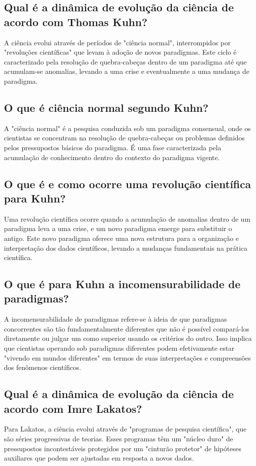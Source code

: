 \documentclass[12pt]{article}
\begin{document}
\subsection{\textbf{Qual é a dinâmica de evolução da ciência de acordo com Thomas Kuhn?}}
A ciência evolui através de períodos de "ciência normal", interrompidos por "revoluções científicas" que levam à adoção de novos paradigmas. Este ciclo é caracterizado pela resolução de quebra-cabeças dentro de um paradigma até que acumulam-se anomalias, levando a uma crise e eventualmente a uma mudança de paradigma.
\subsection{\textbf{O que é ciência normal segundo Kuhn?}}
A "ciência normal" é a pesquisa conduzida sob um paradigma consensual, onde os cientistas se concentram na resolução de quebra-cabeças ou problemas definidos pelos pressupostos básicos do paradigma. É uma fase caracterizada pela acumulação de conhecimento dentro do contexto do paradigma vigente.
\subsection{\textbf{O que é e como ocorre uma revolução científica para Kuhn?}}
Uma revolução científica ocorre quando a acumulação de anomalias dentro de um paradigma leva a uma crise, e um novo paradigma emerge para substituir o antigo. Este novo paradigma oferece uma nova estrutura para a organização e interpretação dos dados científicos, levando a mudanças fundamentais na prática científica.
\subsection{\textbf{O que é para Kuhn a incomensurabilidade de paradigmas?}}
A incomensurabilidade de paradigmas refere-se à ideia de que paradigmas concorrentes são tão fundamentalmente diferentes que não é possível compará-los diretamente ou julgar um como superior usando os critérios do outro. Isso implica que cientistas operando sob paradigmas diferentes podem efetivamente estar "vivendo em mundos diferentes" em termos de suas interpretações e compreensões dos fenômenos científicos.
\subsection{\textbf{Qual é a dinâmica de evolução da ciência de acordo com Imre Lakatos?}}
Para Lakatos, a ciência evolui através de "programas de pesquisa científica", que são séries progressivas de teorias. Esses programas têm um "núcleo duro" de pressupostos incontestáveis protegidos por um "cinturão protetor" de hipóteses auxiliares que podem ser ajustadas em resposta a novos dados.
\end{document}
